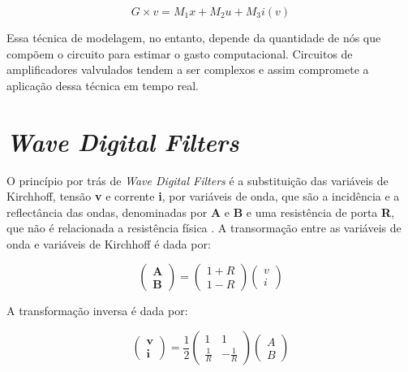 \begin{equation}
G\times v = M_{1}x + M_{2}u + M_{3}i(v) 
\label{Equação4}
\end{equation}

Essa técnica de modelagem, no entanto, depende da quantidade de nós que compõem o circuito para estimar o gasto computacional. Circuitos de amplificadores valvulados tendem a ser complexos e assim compromete a aplicação dessa técnica em tempo real.

\section*{\textit{Wave Digital Filters}}
O princípio por trás de \textit{Wave Digital Filters} é a substituição das variáveis de Kirchhoff, tensão \textbf{v} e corrente \textbf{i}, por variáveis de onda, que são a incidência e a reflectância das ondas, denominadas por \textbf{A} e \textbf{B} e uma resistência de porta \textbf{R}, que não é relacionada a resistência física \cite{mavcak2012real}.
A transormação entre as variáveis de onda e variáveis de Kirchhoff é dada por:


\begin{equation}
\mathbf{\left(\begin{array}{c}
	A \\
	B
	\end{array}\right)}=\left(\begin{array}{cc}
1+R\\1-R 
\end{array}\right) \left(\begin{array}{c}
v \\
i
\end{array}\right)
\label{Equação5}
\end{equation}


A transformação inversa é dada por:

\begin{equation}
\mathbf{\left(\begin{array}{c}
	v \\
	i
	\end{array}\right)}=\frac{1}{2}\left(\begin{array}{cc}
1 & 1 \\
\frac{1}{R} & -\frac{1}{R}
\end{array}\right) \left(\begin{array}{c}
A \\
B
\end{array}\right)
\label{Equação6}
\end{equation}

